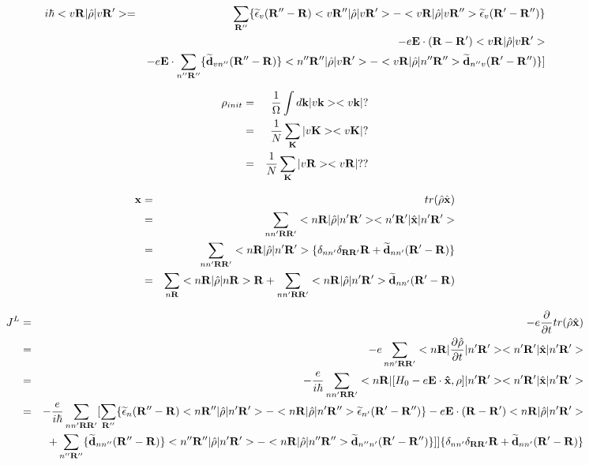 \documentclass[aps,prb,preprint]{revtex4-1}
\begin{document}
\begin{appendix}
\begin{eqnarray}
 i \hbar < v{\bf R}| \hat{\rho} |v{\bf R'}> =&& \sum_{\bf R''} \{ \widetilde{\epsilon}_{v}({\bf R''- R} )  < v{\bf R''}|\hat{\rho} |v{\bf R'}> - < v{\bf R}|\hat{\rho}|v{\bf R''}> \widetilde{\epsilon}_{v}({\bf R'- R''} )   \} \nonumber \\
 && -e{\bf E} \cdot ({\bf R-R'}) < v{\bf R}|\hat{\rho} |v{\bf R'}>\nonumber \\
 && -e{\bf E} \cdot \sum_{n''{\bf R''}} \{ {\bf \widetilde d}_{vn''}({\bf R''-R}) \} < n''{\bf R''}|\hat{\rho} |v{\bf R'}> -< v{\bf R}| \hat{\rho}|n''{\bf R''}> {\bf \widetilde d}_{n''v}({\bf R'-R''}) \} ] \nonumber \\ 
\end{eqnarray} 

\begin{eqnarray}
 \rho_{init} =&& \frac{1}{\Omega} \int d{\bf k} |v{\bf k}>< v{\bf k}| ? \nonumber \\ 
 =&& \frac{1}{N} \sum_{\bf K} |v{\bf K}>< v{\bf K}| ? \nonumber \\ 
  =&& \frac{1}{N} \sum_{\bf K} |v{\bf R}>< v{\bf R}| ??
\end{eqnarray} 

\begin{eqnarray}
{\bf x} &=&  tr(\hat{\rho}\hat{\bf x}) \nonumber \\
 &=&   \sum_{nn'{\bf RR'}} <n{\bf R}|\hat{\rho}|n'{\bf R'}> <n'{\bf R'}|\hat{\bf x}|n'{\bf R'}>  \nonumber \\ 
  &=&  \sum_{nn'{\bf RR'}}  <n{\bf R}|\hat{\rho}|n'{\bf R'}>  \{ \delta_{nn'} \delta_{\bf RR'} {\bf R}  + {\bf \widetilde d}_{nn'}({\bf R'-R}) \}\nonumber \\ 
  &=&  \sum_{n{\bf R}}  <n{\bf R}|\hat{\rho}|n{\bf R}>  {\bf R}  + \sum_{nn'{\bf RR'}} <n{\bf R}|\hat{\rho}|n'{\bf R'}> {\bf \widetilde d}_{nn'}({\bf R'-R}) 
\end{eqnarray} 

\begin{eqnarray}
J^L &=&  -e\frac{\partial}{\partial t} tr(\hat{\rho}\hat{\bf x}) \nonumber \\
 &=&  -e  \sum_{nn'{\bf RR'}} <n{\bf R}|\frac{\partial \hat{\rho} }{\partial t}|n'{\bf R'}> <n'{\bf R'}|\hat{\bf x}|n'{\bf R'}> \nonumber \\ 
  &=& -\frac{e}{i\hbar} \sum_{nn'{\bf RR'}}  <n{\bf R}|[H_0-e{\bf E \cdot \hat{x}}, \rho ]|n'{\bf R'}> <n'{\bf R'}|\hat{\bf x}|n'{\bf R'}> \nonumber \\ 
 &=& -\frac{e}{i\hbar} \sum_{nn'{\bf RR'}} [ \sum_{\bf R''} \{ \widetilde{\epsilon}_{n}({\bf R''- R} )  < n{\bf R''}|\hat{\rho} |n'{\bf R'}> - < n{\bf R}| \hat{\rho}|n'{\bf R''}> \widetilde{\epsilon}_{n'}({\bf R'- R''} )   \} -e{\bf E} \cdot ({\bf R-R'}) < n{\bf R}|\hat{\rho} |n'{\bf R'}>  \nonumber \\
  && + \sum_{n''{\bf R''}} \{ {\bf \widetilde d}_{nn''}({\bf R''-R}) \} < n''{\bf R''}|\hat{\rho} |n'{\bf R'}> -< n{\bf R}| \hat{\rho}|n''{\bf R''}> {\bf \widetilde d}_{n''n'}({\bf R'-R''}) \} ] ] \{ \delta_{nn'} \delta_{\bf RR'} {\bf R}  + {\bf \widetilde d}_{nn'}({\bf R'-R}) \}\nonumber \\ 
\end{eqnarray} 


\end{appendix}
\end{document}
